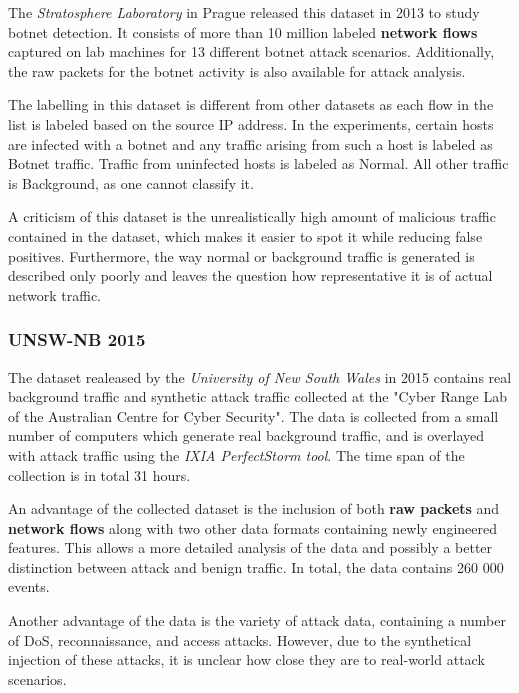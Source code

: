 The \textit{Stratosphere Laboratory} in Prague released this dataset in 2013 to study botnet detection. It consists of more than 10 million labeled \textbf{network flows} captured on lab machines for 13 different botnet attack scenarios. Additionally, the raw packets for the botnet activity is also available for attack analysis. 

The labelling in this dataset is different from other datasets as each  flow  in  the  list  is  labeled  based  on  the  source  IP  address.  In  the experiments,  certain  hosts  are  infected  with  a  botnet  and  any  traffic  arising from such a host is labeled as Botnet traffic. Traffic from uninfected hosts is labeled as Normal. All other traffic is Background, as one cannot classify it. 

A criticism of this dataset is the unrealistically high amount of malicious traffic contained in the dataset, which makes it easier to spot it while reducing false positives. Furthermore, the way normal or background traffic is generated is described only poorly and leaves the question how representative it is of actual network traffic.

\subsubsection*{UNSW-NB 2015 \cite{moustafa_unsw-nb15:_2015}}

The dataset realeased by the \textit{University of New South Wales} in 2015 contains real background traffic and synthetic attack traffic collected at the "Cyber Range Lab of the Australian Centre for Cyber Security". The data is collected from a small number of computers which generate real background traffic, and is overlayed with attack traffic using the \textit{IXIA PerfectStorm tool}. The time span of the collection is in total 31 hours.

An advantage of the collected dataset is the inclusion of both \textbf{raw packets} and \textbf{network flows} along with two other data formats containing newly engineered features. This allows a more detailed analysis of the data and possibly a better distinction between attack and benign traffic. In total, the data contains 260 000 events.

Another advantage of the data is the variety of attack data, containing a number of DoS, reconnaissance, and access attacks. However, due to the synthetical injection of these attacks, it is unclear how close they are to real-world attack scenarios.

